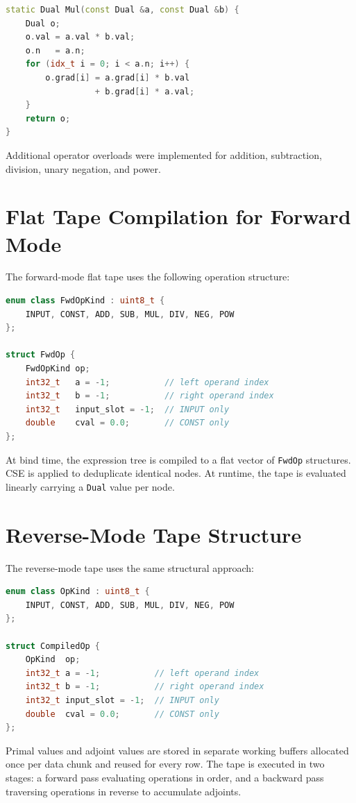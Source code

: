 \documentclass[12pt]{report}
\begin{document}
\begin{lstlisting}[language=C++]
static Dual Mul(const Dual &a, const Dual &b) {
    Dual o;
    o.val = a.val * b.val;
    o.n   = a.n;
    for (idx_t i = 0; i < a.n; i++) {
        o.grad[i] = a.grad[i] * b.val
                  + b.grad[i] * a.val;
    }
    return o;
}
\end{lstlisting}

Additional operator overloads were implemented for addition, subtraction,
division, unary negation, and power.

\section{Flat Tape Compilation for Forward Mode}

The forward-mode flat tape uses the following operation structure:

\begin{lstlisting}[language=C++]
enum class FwdOpKind : uint8_t {
    INPUT, CONST, ADD, SUB, MUL, DIV, NEG, POW
};

struct FwdOp {
    FwdOpKind op;
    int32_t   a = -1;           // left operand index
    int32_t   b = -1;           // right operand index
    int32_t   input_slot = -1;  // INPUT only
    double    cval = 0.0;       // CONST only
};
\end{lstlisting}

At bind time, the expression tree is compiled to a flat vector of
\texttt{FwdOp} structures. CSE is applied to deduplicate identical nodes.
At runtime, the tape is evaluated linearly carrying a \texttt{Dual} value
per node.

\section{Reverse-Mode Tape Structure}

The reverse-mode tape uses the same structural approach:

\begin{lstlisting}[language=C++]
enum class OpKind : uint8_t {
    INPUT, CONST, ADD, SUB, MUL, DIV, NEG, POW
};

struct CompiledOp {
    OpKind  op;
    int32_t a = -1;           // left operand index
    int32_t b = -1;           // right operand index
    int32_t input_slot = -1;  // INPUT only
    double  cval = 0.0;       // CONST only
};
\end{lstlisting}

Primal values and adjoint values are stored in separate working buffers
allocated once per data chunk and reused for every row. The tape is
executed in two stages: a forward pass evaluating operations in order,
and a backward pass traversing operations in reverse to accumulate adjoints.
\end{document}
